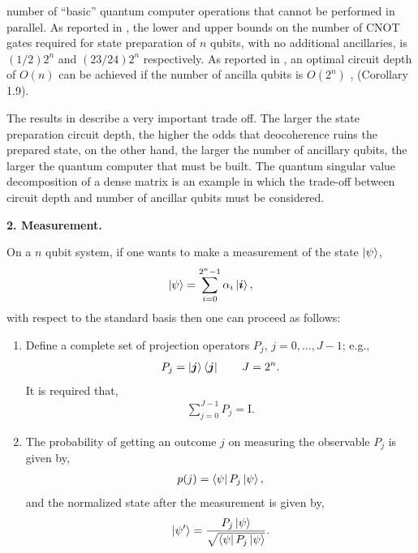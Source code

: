 \documentclass[a4paper,fleqn]{cas-sc}
\newcommand{\bmi}{\mbox{\boldmath $i$\unboldmath}}
\newcommand{\bmj}{\mbox{\boldmath $j$\unboldmath}}
\begin{document}
number of ``basic'' quantum computer operations that cannot be performed in 
parallel.  As reported in \cite{PhysRevA.93.032318,plesch2011quantum}, 
the lower and upper
bounds on the number of CNOT gates required for state preparation of 
$n$ qubits, with no additional ancillaries, is $(1/2)2^{n}$ and
$(23/24)2^{n}$ respectively.  As reported in \cite{zhang2022quantum},
an optimal circuit depth of $O(n)$ can be achieved if the number of
ancilla qubits is $O(2^{n})$ 
\cite{sun2023asymptotically},\cite{rosenthal2023querydepthupperbounds} 
(Corollary 1.9).
\par\noindent
The results in \cite{sun2023asymptotically,rosenthal2023querydepthupperbounds,plesch2011quantum}
describe a very important trade off.  The larger the state preparation
circuit depth, the higher the odds that deocoherence ruins the prepared 
state, on the other hand, the larger the number of ancillary qubits,
the larger the quantum computer that must be built.  The quantum singular
value decomposition of a dense matrix\cite{VQSVD} is an example in which
the trade-off between circuit depth and number of ancillar qubits must
be considered.
\par\noindent
\textbf{2. Measurement.}
\par\noindent
On a $n$ qubit system, if one wants to make a measurement of the
state $\ket{\psi}$,
\begin{eqnarray}
\ket{\psi}=\sum_{i=0}^{2^{n}-1} \alpha_{i}\ket{\bmi}, \label{statestandard}
\end{eqnarray}
with respect to the standard basis then one can proceed as follows:
\begin{enumerate}
\item Define a complete set of
  projection operators $P_{j}$, $j=0,\ldots,J-1$; e.g.,
  \begin{eqnarray}
  P_{j}=\ket{\bmj}\bra{\bmj} \hspace{20pt} J=2^{n}. \label{def_proj}
  \end{eqnarray}
  It is required that,
  \begin{eqnarray*}
  \sum_{j=0}^{J-1} P_{j}=\mbox{I}.
  \end{eqnarray*}
\item The probability of getting an outcome $j$ on measuring the
  observable $P_{j}$  is given by,
  \begin{eqnarray*}
  p(j)=\bra{\psi}P_{j}\ket{\psi},
  \end{eqnarray*}
  and the normalized state after the measurement is given by,
  \begin{eqnarray}
  \ket{\psi'}=\frac{P_{j}\ket{\psi}}{\sqrt{\bra{\psi}P_{j}\ket{\psi}}}.
     \label{aftermeas}
  \end{eqnarray}
\end{enumerate}
\end{document}
